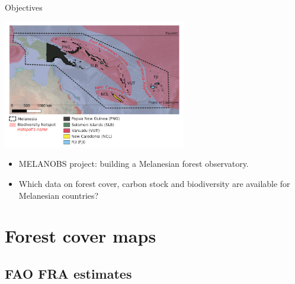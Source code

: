 \documentclass[10pt,table,dvipsnames,compress]{beamer}
\begin{document}
\begin{frame}[label={sec:org28535b5}]{Objectives}
\begin{center}
\includegraphics[width=8cm]{figs/carte_melanobs.jpg}
\end{center}

\begin{itemize}
\item MELANOBS project: building a Melanesian forest observatory.
\item Which data on forest cover, carbon stock and biodiversity are available for Melanesian countries?
\end{itemize}
\end{frame}

\section{Forest cover maps}
\label{sec:org39dd3c2}

\subsection{FAO FRA estimates}
\label{sec:orga6bbd6d}
\end{document}
